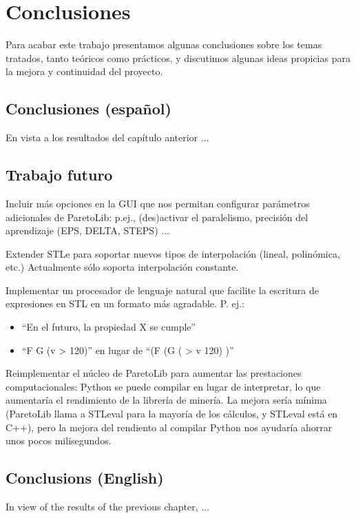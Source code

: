 \chapter{Conclusiones}
\label{cha:concl}
Para acabar este trabajo presentamos algunas conclusiones sobre los temas tratados, tanto teóricos como prácticos, y discutimos algunas ideas propicias para la mejora y continuidad del proyecto.
\section{Conclusiones (español)}
En vista a los resultados del capítulo anterior $\ldots$

\section{Trabajo futuro}

Incluir más opciones en la GUI que nos permitan configurar parámetros adicionales de ParetoLib: p.ej., (des)activar el paralelismo, precisión del aprendizaje (EPS, DELTA, STEPS) ...

Extender STLe para soportar nuevos tipos de interpolación (lineal, polinómica, etc.) Actualmente sólo soporta interpolación constante.

Implementar un procesador de lenguaje natural que facilite la escritura de expresiones en STL en un formato más agradable. P. ej.:
\begin{itemize}
 \item ``En el futuro, la propiedad X se cumple''
 \item ``F G (v > 120)'' en lugar de ``(F (G ( > v 120) )''
\end{itemize}

Reimplementar el núcleo de ParetoLib para aumentar las prestaciones computacionales: Python se puede compilar en lugar de interpretar, lo que aumentaría el rendimiento de la librería de minería. La mejora sería mínima (ParetoLib llama a STLeval para la mayoría de los cálculos, y STLeval está en C++), pero la mejora del rendiento al compilar Python nos ayudaría ahorrar unos pocos milisegundos.

\section{Conclusions (English)}
In view of the results of the previous chapter, $\ldots$


